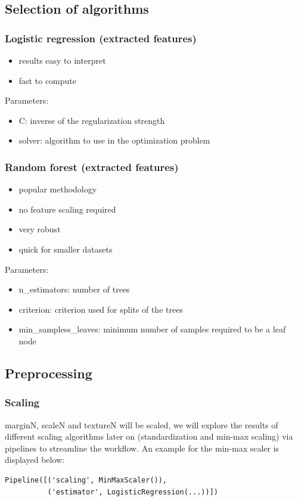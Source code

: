 \documentclass{sig-alternate-05-2015}
\begin{document}
\subsection{Selection of algorithms}
\subsubsection{Logistic regression (extracted features)}
\begin{itemize}
  \item results easy to interpret
  \item fast to compute
\end{itemize}

Parameters:
\begin{itemize}
  \item C: inverse of the regularization strength
  \item solver: algorithm to use in the optimization problem
\end{itemize}


\subsubsection{Random forest (extracted features)}
\begin{itemize}
  \item popular methodology
  \item no feature scaling required
  \item very robust
  \item quick for smaller datasets
\end{itemize}

Parameters:
\begin{itemize}
  \item n\_estimators: number of trees
  \item criterion: criterion used for splits of the trees
  \item min\_sampless\_leaves: minimum number of samples required to be a leaf node 
\end{itemize}

\subsection{Preprocessing}

\subsubsection{Scaling}
marginN, scaleN and textureN will be scaled, we will explore the results of different scaling algorithms later on (standardization and min-max scaling) via pipelines to streamline the workflow.
An example for the min-max scaler is displayed below:
\begin{verbatim}
Pipeline([('scaling', MinMaxScaler()),
          ('estimator', LogisticRegression(...))])
\end{verbatim}
\end{document}
